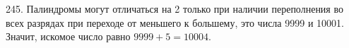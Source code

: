 245. Палиндромы могут отличаться на 2 только при наличии переполнения во всех разрядах при переходе от меньшего к большему, это числа 9999 и 10001. Значит, искомое число равно $9999+5=10004.$\\
